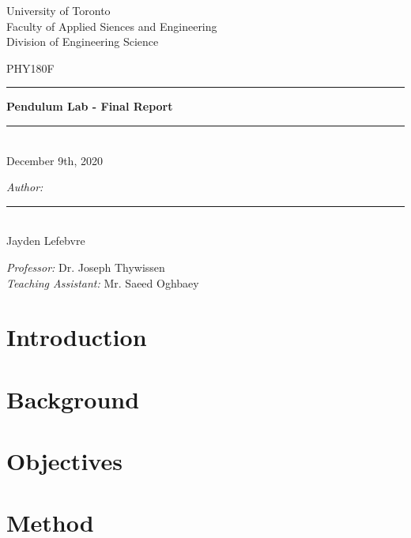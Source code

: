 \documentclass[12pt,a4paper]{article}
\begin{document}
\doublespacing

\begin{titlepage}
    \begin{center}
        {\large \sc University of Toronto} \\
        {\large \sc Faculty of Applied Siences and Engineering}\\[0.7cm]
        {\small \sc Division of Engineering Science}
        
        \vspace{4cm}

        {\large \sc PHY180F}\\
        \rule{\linewidth}{2pt}
        
        \vspace{0.7em} %
        {\Large \bfseries Pendulum Lab - Final Report}
        \vspace{0.2em} %
        
        \rule{\linewidth}{2pt} \\
        {\small \sc December 9th, 2020}
    \end{center}
    
    \vspace{2.8cm}

    \begin{minipage}{0.43\textwidth}
        \emph{Author:}\\[1cm]
        \rule{0.9\linewidth}{0.3mm}\\
        Jayden Lefebvre
    \end{minipage}
    \hspace{1cm}
    \begin{minipage}{0.43\textwidth}
        \emph{Professor:}
        \hspace{1.5cm} Dr. Joseph Thywissen\\
        \emph{Teaching Assistant: }
        Mr. Saeed Oghbaey
    \end{minipage}

    \vfill
\end{titlepage}


\pagestyle{empty}
\tableofcontents
\newpage
\setcounter{page}{1}
\pagestyle{plain} %

\section{Introduction}
\label{section:intro}


\section{Background}
\label{section:background}


\section{Objectives}
\label{section:objectives}


\section{Method}
\label{section:method}



\newpage



\end{document}
